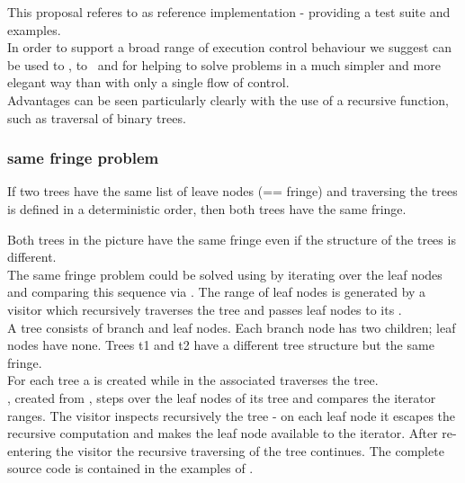 
This proposal referes to \boostcoroutine as reference implementation - providing
a test suite and examples.\\
\newline
In order to support a broad range of execution control behaviour we suggest
\coro can be used to \escrecloops, to \escreccomps~and for \coopmultitasking
helping to solve problems in a much simpler and more elegant way than with only
a single flow of control.\\ Advantages can be seen particularly clearly with the use of a recursive
function, such as traversal of binary trees.

\subsubsection*{same fringe problem}

If two trees have the same list of leave nodes (== fringe) and traversing the
trees is defined in a deterministic order, then both trees have the same fringe.\\


Both trees in the picture have the same fringe even if the structure of the trees
is different.\\
\newline
The same fringe problem could be solved using \coro by iterating over the leaf
nodes and comparing this sequence via . The range of leaf
nodes is generated by a visitor which recursively traverses the tree and passes
leaf nodes to its \coro.\\
\newline
{}
A tree consists of branch and leaf nodes. Each branch node has two children;
leaf nodes have none. Trees t1 and t2 have a different tree structure but the
same fringe.\\
For each tree a \coro is created while in the associated \corofunction
{} traverses the tree.\\
\coroiterator, created from \coro, steps over the leaf nodes of its tree and
 compares the iterator ranges.
\newline
\newline
{}
The visitor inspects recursively the tree - on each leaf node it escapes the recursive
computation and makes the leaf node available to the iterator. After re-entering the
visitor the recursive traversing of the tree continues.
\newline
The complete source code is contained in the examples of \boostcoroutine.
